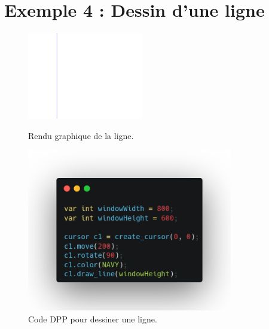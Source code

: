 \documentclass[12pt,a4paper]{report}
\begin{document}
\section{Exemple 4 : Dessin d'une ligne}
\begin{figure}[H]
    \centering
    \includegraphics[width=0.45\textwidth]{assets/render/draw_line.png}
    \caption{Rendu graphique de la ligne.}
    \includegraphics[width=0.8\textwidth]{assets/code/draw_line_dpp.png}
    \caption{Code DPP pour dessiner une ligne.}
\end{figure}
\end{document}
